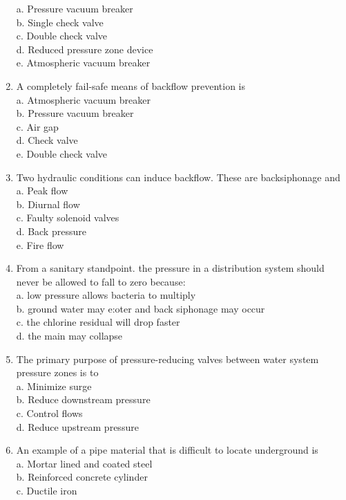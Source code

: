 \begin{enumerate}[1.]
a. Pressure vacuum breaker\\
b. Single check valve\\
c. Double check valve\\
d. Reduced pressure zone device\\
e. Atmospheric vacuum breaker\\
\item A completely fail-safe means of backflow prevention is\\
a. Atmospheric vacuum breaker\\
b. Pressure vacuum breaker\\
c. Air gap\\
d. Check valve\\
e. Double check valve\\
\item Two hydraulic conditions can induce backflow. These are backsiphonage and\\
a. Peak flow\\
b. Diurnal flow\\
c. Faulty solenoid valves\\
d. Back pressure\\
e. Fire flow\\
\item From a sanitary standpoint. the pressure in a distribution system should never be allowed to fall to zero because:\\
a. low pressure allows bacteria to multiply\\
b. ground water may e:oter and back siphonage may occur\\
c. the chlorine residual will drop faster\\
d. the main may collapse\\
\item The primary purpose of pressure-reducing valves between water system pressure zones is to\\
a. Minimize surge\\
b. Reduce downstream pressure\\
c. Control flows\\
d. Reduce upstream pressure\\
\item An example of a pipe material that is difficult to locate underground is\\
a. Mortar lined and coated steel\\
b. Reinforced concrete cylinder\\
c. Ductile iron\\

\end{enumerate}
